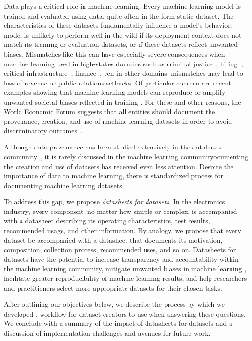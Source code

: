 Data plays a critical role in machine learning. Every machine learning
model is trained and evaluated using data, quite often in the
form  static dataset. The characteristics of these
datasets fundamentally influence a model's behavior:  model is
unlikely to perform well in the wild if its deployment context does
not match its training or evaluation datasets, or if these datasets
reflect unwanted
 biases. Mismatches like this can have especially severe
consequences when machine learning  used in
high-stakes domains\edit{,} such as criminal
justice~\cite{facerec_law_us, facerec_law_elsewhere, compass},
hiring~\cite{hiring_ml_us}, critical infrastructure~\cite{water,
grid},  finance~\cite{newinvestor}. ven in other
domains, mismatches may lead to loss of revenue or public relations
setbacks. Of particular concern are recent examples showing that
machine learning models can reproduce or amplify unwanted societal
biases reflected in training  \cite{gendershades,
amazon, word2vec}. For these and other reasons, the World Economic
Forum suggests that all entities should document the provenance,
creation, and use of machine learning datasets in order to avoid
discriminatory outcomes~\cite{wef}.

Although data provenance has been studied extensively in the databases
community~\cite{provenance,datahub}, it is rarely discussed in the
machine learning communityocumenting the creation and use of
datasets has received even less attention. Despite the importance of
data to machine learning, there is  standardized
process for documenting machine learning datasets.

To address this gap, we propose \emph{datasheets for datasets}. In the
electronics industry, every component, no matter how simple or
complex, is accompanied with a datasheet describing its operating
characteristics, test results, recommended usage, and other
information. By analogy, we propose that every dataset be accompanied
with a datasheet that documents its motivation, composition,
collection process, recommended uses, and so on. Datasheets for
datasets have the potential to increase transparency and
accountability within the machine learning community, mitigate
unwanted  biases in machine learning ,
facilitate greater reproducibility of machine learning results, and
help researchers and practitioners  select more appropriate datasets
for their chosen tasks.

After outlining our objectives below, we describe the process by which
we developed .  workflow for dataset creators to
use when answering these questions. We conclude with a summary of the
impact  of datasheets for datasets and a discussion of
implementation challenges and avenues for future work.
